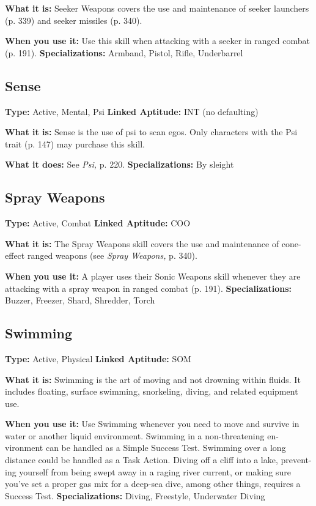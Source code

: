 \textbf{What it is:} Seeker Weapons covers the use and 
maintenance of seeker launchers (p. 339) and seeker 
missiles (p. 340).

\textbf{When you use it:} Use this skill when attacking with 
a seeker in ranged combat (p. 191).
\textbf{Specializations:} Armband, Pistol, Rifle, Underbarrel

\subsection{Sense}

\textbf{Type:} Active, Mental, Psi
\textbf{Linked Aptitude:} INT (no defaulting)

\textbf{What it is:} Sense is the use of psi to scan egos. Only 
characters with the Psi trait (p. 147) may purchase 
this skill.

\textbf{What it does:} See \textit{Psi,} p. 220.
\textbf{Specializations:} By sleight

\subsection{Spray Weapons}

\textbf{Type:} Active, Combat
\textbf{Linked Aptitude:} COO

\textbf{What it is:} The Spray Weapons skill covers the use 
and maintenance of cone-effect ranged weapons (see 
\textit{Spray Weapons,} p. 340).

\textbf{When you use it:} A player uses their Sonic Weapons 
skill whenever they are attacking with a spray weapon 
in ranged combat (p. 191).
\textbf{Specializations:} Buzzer, Freezer, Shard, Shredder, Torch

\subsection{Swimming}

\textbf{Type:} Active, Physical
\textbf{Linked Aptitude:} SOM

\textbf{What it is:} Swimming is the art of moving and 
not drowning within fluids. It includes floating, 
surface swimming, snorkeling, diving, and related 
equipment use.

\textbf{When you use it:} Use Swimming whenever you 
need to move and survive in water or another liquid 
environment. Swimming in a non-threatening en-
vironment can be handled as a Simple Success Test. 
Swimming over a long distance could be handled as 
a Task Action. Diving off a cliff into a lake, prevent-
ing yourself from being swept away in a raging river 
current, or making sure you've set a proper gas mix 
for a deep-sea dive, among other things, requires a 
Success Test.
\textbf{Specializations:} Diving, Freestyle, Underwater Diving

